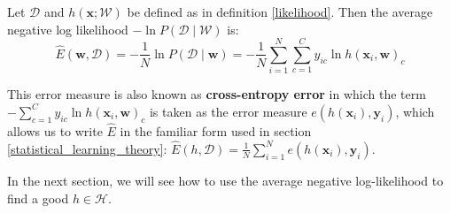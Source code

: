 \begin{definition}
	\label{negative_log-likelihood}
	Let $\mathcal{D}$ and $h(\mathbf{x}; \mathcal{W})$ be defined as in definition \ref{likelihood}. Then the average negative log likelihood $-\ln P(\mathcal{D} \mid \mathcal{W})$ is:
	$$
	\hat{E}(\mathbf{w}, \mathcal{D}) = - \frac{1}{N}\ln P(\mathcal{D} \mid \mathbf{w}) = - \frac{1}{N}\sum\limits_{i=1}^N\sum\limits_{c=1}^C y_{ic} \ln h(\mathbf{x}_i, \mathbf{w})_c
	$$
\end{definition}
\noindent
This error measure is also known as \textbf{cross-entropy error} in which the term \\$-\sum_{c=1}^C y_{ic} \ln h(\mathbf{x}_i, \mathbf{w})_c$ is taken as the error measure $e(h(\mathbf{x}_i), \mathbf{y}_i)$, which allows us to write $\hat{E}$ in the familiar form used in section \ref{statistical_learning_theory}: $\hat{E}(h, \mathcal{D}) = \frac{1}{N}\sum_{i=1}^N e(h(\mathbf{x}_i), \mathbf{y}_i)$.

In the next section, we will see how to use the average negative log-likelihood to find a good $h \in \mathcal{H}$.
